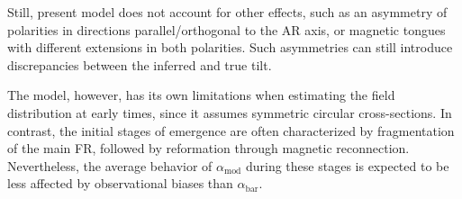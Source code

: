 \documentclass[namedreferences,hyperref,optionalrh]{spr-sola}
\newcommand{\pc}[1]{{\color{ForestGreen}{P comment: #1}}}
\begin{document}
\pc{The following limitations can be kept for the conclusion, calling for an extension of the model. Here it is too much lowering the usefulness of the method:} Still, present model does not account for other effects, such as an asymmetry of polarities in directions parallel/orthogonal to the AR axis, or magnetic tongues with different extensions in both polarities.
Such asymmetries can still introduce discrepancies between the inferred and true tilt. 


 \pc{This is more for a discussion section:}
The model, however, has its own limitations when estimating the field distribution at early times, since it assumes symmetric circular cross-sections. In contrast, the initial stages of emergence are often characterized by fragmentation of the main FR, followed by reformation through magnetic reconnection. Nevertheless, the average behavior of $\alpha_\mathrm{mod}$ during these stages is expected to be less affected by observational biases than $\alpha_\mathrm{bar}$.  \pc{because remove tongue effects?}





%
 \begin{acks}
%
 \end{acks}


 \begin{authorcontribution}

 \end{authorcontribution}
%
 \begin{fundinginformation}

 \end{fundinginformation}
%
 \begin{dataavailability}

 \end{dataavailability}
%
 \begin{ethics}
 \begin{conflict}
%
 \end{conflict}
 \end{ethics}


%
%
 
   
%
%
%   
%  
\end{document}
